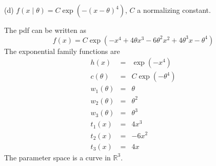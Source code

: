 \documentclass[12pt]{article}
\begin{document}
\bigskip
\noindent
(d) $f(x\mid\theta)=C\exp(-(x-\theta)^4)$, $C$ a normalizing
constant.

\bigskip
\noindent
The pdf can be written as
$$f(x)=C
\exp(-x^4+4\theta x^3-6\theta^2x^2+4\theta^3x-\theta^4)$$
The exponential family functions are
\begin{eqnarray*}
h(x)&=&\exp(-x^4)\\
c(\theta)&=&C\exp(-\theta^4)\\
w_1(\theta)&=&\theta\\
w_2(\theta)&=&\theta^2\\
w_3(\theta)&=&\theta^3\\
t_1(x)&=&4x^3\\
t_2(x)&=&-6x^2\\
t_3(x)&=&4x
\end{eqnarray*}
The parameter space
is a curve in $\mathbb R^3$.



\end{document}
